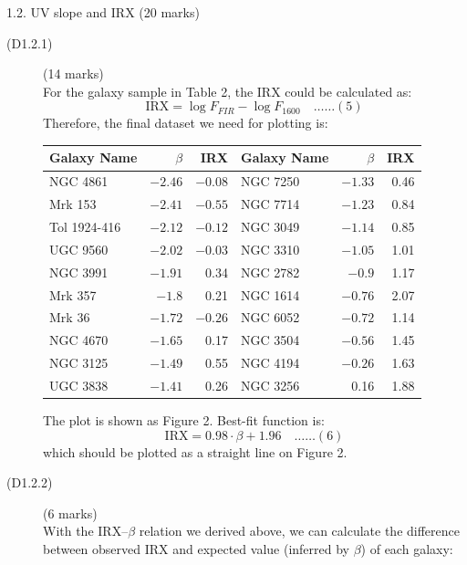 1.2. UV slope and IRX \hfill(20 marks)

\begin{description}
\item[(D1.2.1)] \hfill(14 marks)\\
  For the galaxy sample in Table 2, the IRX could be calculated as:
  \[ \mathrm{IRX} = \log F_{FIR} - \log F_{1600} \quad\ldots\ldots(5) \]
  Therefore, the final dataset we need for plotting is:

  \begin{center}
  \begin{tabular}{lrr|lrr}
    Galaxy Name & $\beta$ & IRX & Galaxy Name & $\beta$ & IRX \\
    \hline
    NGC 4861     & $-2.46$ & $-0.08$ & NGC 7250 & $-1.33$ & 0.46 \\
    Mrk 153      & $-2.41$ & $-0.55$ & NGC 7714 & $-1.23$ & 0.84 \\
    Tol 1924-416 & $-2.12$ & $-0.12$ & NGC 3049 & $-1.14$ & 0.85 \\
    UGC 9560     & $-2.02$ & $-0.03$ & NGC 3310 & $-1.05$ & 1.01 \\
    NGC 3991     & $-1.91$ & 0.34    & NGC 2782 & $-0.9$  & 1.17 \\
    Mrk 357      & $-1.8$  & 0.21    & NGC 1614 & $-0.76$ & 2.07 \\
    Mrk 36       & $-1.72$ & $-0.26$ & NGC 6052 & $-0.72$ & 1.14 \\
    NGC 4670     & $-1.65$ & 0.17    & NGC 3504 & $-0.56$ & 1.45 \\
    NGC 3125     & $-1.49$ & 0.55    & NGC 4194 & $-0.26$ & 1.63 \\
    UGC 3838     & $-1.41$ & 0.26    & NGC 3256 & 0.16    & 1.88 \\
  \end{tabular}
  \end{center}

  The plot is shown as Figure 2. Best-fit function is:
  \[ \mathrm{IRX} = 0.98\cdot\beta + 1.96 \quad\ldots\ldots(6) \]
  which should be plotted as a straight line on Figure 2.

\item[(D1.2.2)] \hfill(6 marks)\\
  With the IRX--$\beta$ relation we derived above, we can calculate the
  difference between observed IRX and expected value (inferred by $\beta$) of
  each galaxy:


\end{description}
